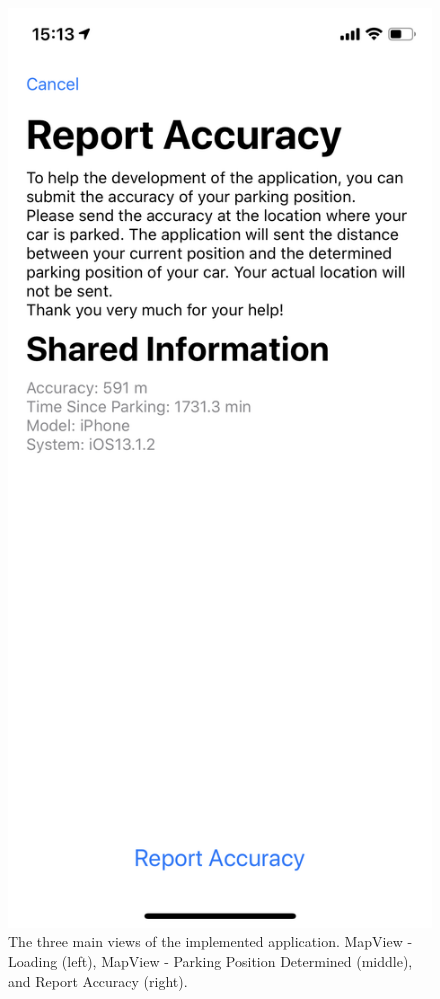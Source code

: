 \begin{figure}[h!]
\begin{minipage}{.33\textwidth}
  \includegraphics[width=.9\linewidth]{images/App/feedback.png}
\end{minipage}
\caption{The three main views of the implemented application. MapView - Loading (left), MapView - Parking Position Determined (middle), and Report Accuracy (right).}
\label{fig:ui}
\end{figure}
\newpage


